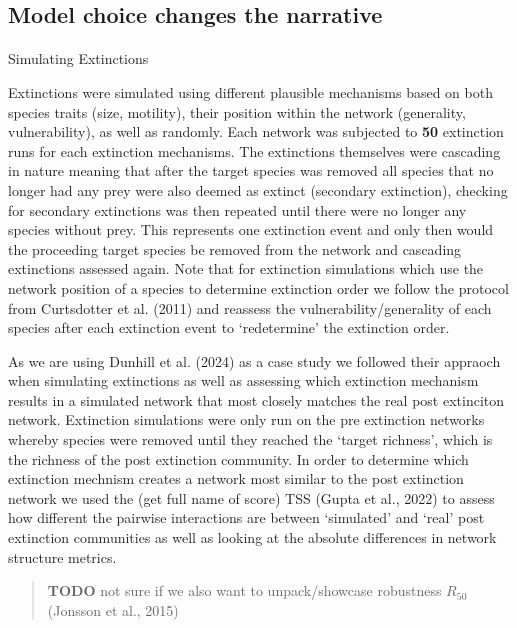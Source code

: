 \documentclass[
]{article}
\makeatletter
\let\oldparagraph\paragraph
\renewcommand{\paragraph}{
    \@ifstar
      \xxxParagraphStar
      \xxxParagraphNoStar
  }
\newcommand{\xxxParagraphStar}[1]{\oldparagraph*{#1}\mbox{}}
\newcommand{\xxxParagraphNoStar}[1]{\oldparagraph{#1}\mbox{}}
\makeatother
\begin{document}
\subsection{Model choice changes the
narrative}\label{model-choice-changes-the-narrative}

\paragraph{Simulating Extinctions}\label{simulating-extinctions}

Extinctions were simulated using different plausible mechanisms based on
both species traits (size, motility), their position within the network
(generality, vulnerability), as well as randomly. Each network was
subjected to \textbf{50} extinction runs for each extinction mechanisms.
The extinctions themselves were cascading in nature meaning that after
the target species was removed all species that no longer had any prey
were also deemed as extinct (secondary extinction), checking for
secondary extinctions was then repeated until there were no longer any
species without prey. This represents one extinction event and only then
would the proceeding target species be removed from the network and
cascading extinctions assessed again. Note that for extinction
simulations which use the network position of a species to determine
extinction order we follow the protocol from Curtsdotter et al. (2011)
and reassess the vulnerability/generality of each species after each
extinction event to `redetermine' the extinction order.

As we are using Dunhill et al. (2024) as a case study we followed their
appraoch when simulating extinctions as well as assessing which
extinction mechanism results in a simulated network that most closely
matches the real post extinciton network. Extinction simulations were
only run on the pre extinction networks whereby species were removed
until they reached the `target richness', which is the richness of the
post extinction community. In order to determine which extinction
mechnism creates a network most similar to the post extinction network
we used the (get full name of score) TSS (Gupta et al., 2022) to assess
how different the pairwise interactions are between `simulated' and
`real' post extinction communities as well as looking at the absolute
differences in network structure metrics.

\begin{quote}
\textbf{TODO} not sure if we also want to unpack/showcase robustness
\(R_{50}\) (Jonsson et al., 2015)
\end{quote}
\end{document}
